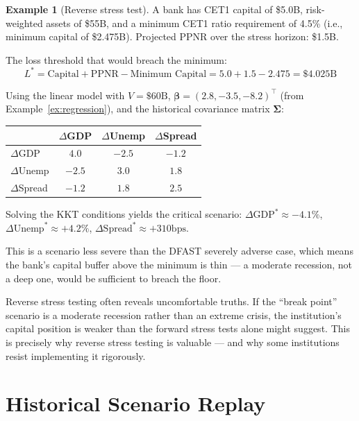 \documentclass[11pt, a4paper]{article}
\theoremstyle{definition}
\newtheorem{example}{Example}[section]
\theoremstyle{plain}
\theoremstyle{remark}
\begin{document}
\begin{example}[Reverse stress test]\label{ex:reverse}
A bank has CET1 capital of \$5.0B, risk-weighted assets of \$55B,
and a minimum CET1 ratio requirement of 4.5\% (i.e., minimum capital of \$2.475B).
Projected PPNR over the stress horizon: \$1.5B.

The loss threshold that would breach the minimum:
\[
    L^* = \text{Capital} + \text{PPNR} - \text{Minimum Capital}
    = 5.0 + 1.5 - 2.475 = \$4.025\text{B}
\]

Using the linear model with $V = \$60\text{B}$, $\bm{\beta} = (2.8, -3.5, -8.2)^\top$
(from Example~\ref{ex:regression}), and the historical covariance matrix $\bm{\Sigma}$:

\begin{center}
\begin{tabular}{@{}lccc@{}}
\toprule
& $\Delta$GDP & $\Delta$Unemp & $\Delta$Spread \\
\midrule
$\Delta$GDP & $4.0$ & $-2.5$ & $-1.2$ \\
$\Delta$Unemp & $-2.5$ & $3.0$ & $1.8$ \\
$\Delta$Spread & $-1.2$ & $1.8$ & $2.5$ \\
\bottomrule
\end{tabular}
\end{center}

Solving the KKT conditions yields the critical scenario:
$\Delta\text{GDP}^* \approx -4.1\%$, $\Delta\text{Unemp}^* \approx +4.2\%$,
$\Delta\text{Spread}^* \approx +310\text{bps}$.

This is a scenario less severe than the DFAST severely adverse case,
which means the bank's capital buffer above the minimum is thin ---
a moderate recession, not a deep one, would be sufficient to breach the floor.
\end{example}

\begin{warningbox}
Reverse stress testing often reveals uncomfortable truths.
If the ``break point'' scenario is a moderate recession rather than an extreme crisis,
the institution's capital position is weaker than the forward stress tests alone might suggest.
This is precisely why reverse stress testing is valuable ---
and why some institutions resist implementing it rigorously.
\end{warningbox}

\section{Historical Scenario Replay}
\label{sec:historical}
\end{document}
